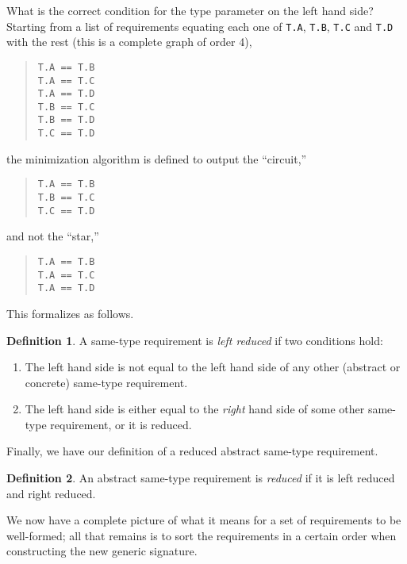 \documentclass[a4paper,headsepline,bibliography=totoc,toc=flat,fleqn,twoside=semi]{scrbook}
\theoremstyle{definition}
\newtheorem{definition}{Definition}[chapter]
\theoremstyle{definition}
\theoremstyle{definition}
\begin{document}
What is the correct condition for the type parameter on the left hand side? Starting from a list of requirements equating each one of \texttt{T.A}, \texttt{T.B}, \texttt{T.C} and \texttt{T.D} with the rest (this is a complete graph of order 4),
\begin{quote}
\begin{verbatim}
T.A == T.B
T.A == T.C
T.A == T.D
T.B == T.C
T.B == T.D
T.C == T.D
\end{verbatim}
\end{quote}
the minimization algorithm is defined to output the ``circuit,''
\begin{quote}
\begin{verbatim}
T.A == T.B
T.B == T.C
T.C == T.D
\end{verbatim}
\end{quote}
and not the ``star,''
\begin{quote}
\begin{verbatim}
T.A == T.B
T.A == T.C
T.A == T.D
\end{verbatim}
\end{quote}
This formalizes as follows.
\begin{definition}\label{left reduced requirement} A same-type requirement is \emph{left reduced} if two conditions hold:
\begin{enumerate}
\item The left hand side is not equal to the left hand side of any other (abstract or concrete) same-type requirement.
\item The left hand side is either equal to the \emph{right} hand side of some other same-type requirement, or it is reduced.
\end{enumerate}
\end{definition}
Finally, we have our definition of a reduced abstract same-type requirement.
\begin{definition}
An abstract same-type requirement is \emph{reduced} if it is left reduced and right reduced.
\end{definition}
We now have a complete picture of what it means for a set of requirements to be well-formed; all that remains is to sort the requirements in a certain order when constructing the new generic signature.
\end{document}

